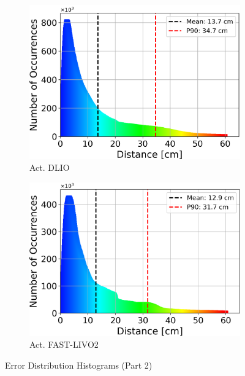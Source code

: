 \documentclass[english, bachelor, utf8]{base/thesis_telematics}
\begin{document}
\begin{figure}
\begin{subfigure}{0.29\textwidth}
    \centering
    \includegraphics[width=\textwidth]{pics/histogram_results/histogram_cond_actuated_dlio.png}
    \caption{Act. DLIO}
    \label{fig:hist_act_dlio}
\end{subfigure}
\begin{subfigure}{0.29\textwidth}
    \centering
    \includegraphics[width=\textwidth]{pics/histogram_results/histogram_cond_actuated_livo.png}
    \caption{Act. FAST-LIVO2}
    \label{fig:hist_act_livo}
\end{subfigure}\vspace{2mm}
    \caption{Error Distribution Histograms (Part 2)}
    \label{fig:combined_results2}
\end{figure}
\end{document}
